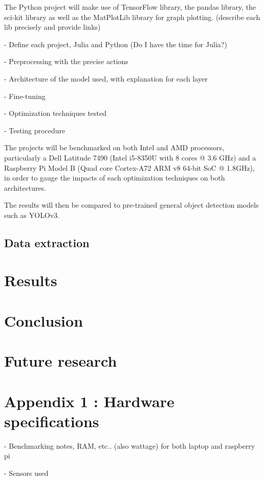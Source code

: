 \documentclass[12pt]{article}
\begin{document}
  The Python project will make use of TensorFlow library, the pandas library, the sci-kit library as well as the MatPlotLib library for graph plotting.
  (describe each lib precisely and provide links)

  - Define each project, Julia and Python (Do I have the time for Julia?)

  - Preprocessing with the precise actions

  - Architecture of the model used, with explanation for each layer

  - Fine-tuning

  - Optimization techniques tested

  - Testing procedure

  The projects will be benchmarked on both Intel and AMD processors, particularly a Dell Latitude 7490 (Intel i5-8350U with 8 cores @ 3.6 GHz) and a Raspberry Pi Model B (Quad core Cortex-A72 ARM v8 64-bit SoC @ 1.8GHz), in order to gauge the impacts of each optimization techniques on both architectures.

  The results will then be compared to pre-trained general object detection models such as YOLOv3.

  \subsection{Data extraction}

  \section{Results}

  \section{Conclusion}

  \section{Future research}

  \section{Appendix 1 : Hardware specifications}

  - Benchmarking notes, RAM, etc.. (also wattage) for both laptop and raspberry pi

  - Sensors used
\end{document}
